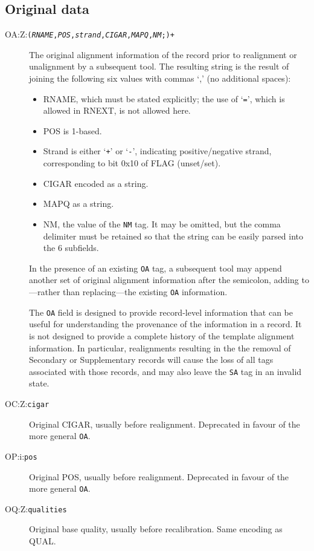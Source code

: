 \documentclass[10pt]{article}
\newcommand{\tagvalue}[1]{{\tt #1}}
\newcommand{\tagregex}[1]{{\tt #1}}
\newcommand{\metavar}[1]{{\rm\emph{#1}}}
\begin{document}
\subsection{Original data}

\begin{description}
\item[OA:Z:\tagregex{(\metavar{RNAME},\metavar{POS},\metavar{strand},\metavar{CIGAR},\metavar{MAPQ},\metavar{NM};)+}]
The original alignment information of the record prior to realignment or unalignment by a subsequent tool.
The resulting string is the result of joining the following six values with commas `,' (no additional spaces):
\begin{itemize}
\item {\sf RNAME}, which must be stated explicitly; the use of `{\tt =}', which is allowed in {\sf RNEXT}, is not allowed here.
\item POS is 1-based.
\item Strand is either `{\tt +}' or `{\tt -}', indicating positive/negative strand, corresponding to bit 0x10 of FLAG (unset/set).
\item CIGAR encoded as a string.
\item MAPQ as a string.
\item NM, the value of the {\tt NM} tag. It may be omitted, but the comma delimiter must be retained so that the string can be easily parsed into the 6 subfields.
\end{itemize}
In the presence of an existing {\tt OA} tag, a subsequent tool may append another set of original alignment information after the semicolon,
adding to---rather than replacing---the existing {\tt OA} information.

The {\tt OA} field is designed to provide record-level information that can be useful for understanding the provenance of the information in a record. 
It is not designed to provide a complete history of the template alignment information. 
In particular, realignments resulting in the the removal of Secondary or Supplementary records will cause the loss of all tags associated with those records, and may also leave the {\tt SA} tag in an invalid state.

\item[OC:Z:\tagvalue{cigar}]
Original CIGAR, usually before realignment.
Deprecated in favour of the more general {\tt OA}.

\item[OP:i:\tagvalue{pos}]
Original {\sf POS}, usually before realignment.
Deprecated in favour of the more general {\tt OA}.

\item[OQ:Z:\tagvalue{qualities}]
Original base quality, usually before recalibration.
Same encoding as {\sf QUAL}.
\end{description}
\end{document}
